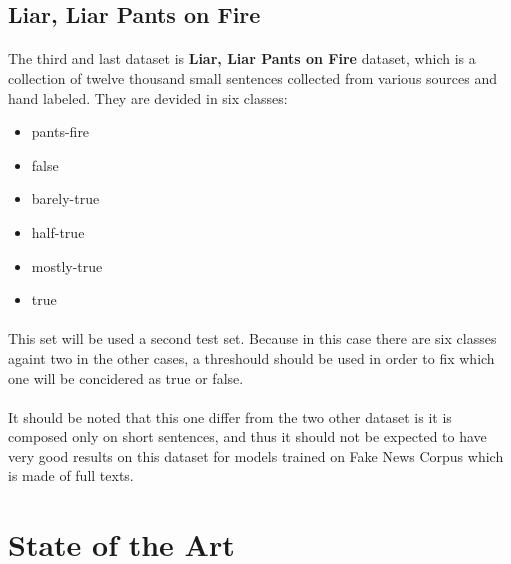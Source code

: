 \subsection{Liar, Liar Pants on Fire}
\paragraph{}
The third and last dataset is \textbf{Liar, Liar Pants on Fire} dataset\cite{Wang2017}, which is a collection of twelve thousand small sentences collected from various sources and hand labeled. They are devided in six classes:
\begin{itemize}
	\item pants-fire
	\item false
	\item barely-true
	\item half-true
	\item mostly-true
	\item true
\end{itemize} 
\paragraph{}
This set will be used a second test set. Because in this case there are six classes againt two in the other cases, a threshould should be used in order to fix which one will be concidered as true or false. 
\paragraph{}
It should be noted that this one differ from the two other dataset is it is composed only on short sentences, and thus it should not be expected to have very good results on this dataset for models trained on Fake News Corpus which is made of full texts. 

\section{State of the Art}